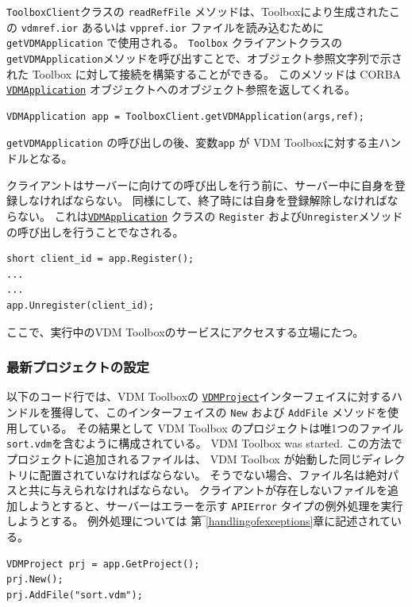 \documentclass[\pformat,12pt]{jarticle}
\newcommand{\VDMApplication}{\hyperlink{interface.VDMApplication}{VDMApplication}}
\newcommand{\VDMProject}{\hyperlink{interface.VDMProject}{VDMProject}}
\begin{document}
{\tt ToolboxClient}クラスの {\tt readRefFile} メソッドは、Toolboxにより生成されたこの \texttt{vdmref.ior} あるいは \texttt{vppref.ior} ファイルを読み込むために{\tt getVDMApplication} で使用される。
 {\tt Toolbox} クライアントクラスの{\tt getVDMApplication}メソッドを呼び出すことで、オブジェクト参照文字列で示された Toolbox に対して接続を構築することができる。
このメソッドは CORBA {\tt \VDMApplication} オブジェクトへのオブジェクト参照を返してくれる。

\begin{verbatim}
VDMApplication app = ToolboxClient.getVDMApplication(args,ref);
\end{verbatim}

{\tt getVDMApplication} の呼び出しの後、変数{\tt app} が VDM Toolboxに対する主ハンドルとなる。

クライアントはサーバーに向けての呼び出しを行う前に、サーバー中に自身を登録しなければならない。
同様にして、終了時には自身を登録解除しなければならない。
これは{\tt \VDMApplication} クラスの  {\tt Register} および{\tt Unregister}メソッドの呼び出しを行うことでなされる。

\begin{verbatim}
short client_id = app.Register();
...
...
app.Unregister(client_id);
\end{verbatim}

ここで、実行中のVDM Toolboxのサービスにアクセスする立場にたつ。

\subsubsection{最新プロジェクトの設定}

以下のコード行では、VDM Toolboxの {\tt \VDMProject}インターフェイスに対するハンドルを獲得して、このインターフェイスの {\tt New} および {\tt AddFile} メソッドを使用している。
その結果として VDM Toolbox のプロジェクトは唯1つのファイル {\tt sort.vdm}を含むように構成されている。
VDM Toolbox was started. 
この方法でプロジェクトに追加されるファイルは、 VDM Toolbox が始動した同じディレクトリに配置されていなければならない。
そうでない場合、ファイル名は絶対パスと共に与えられなければならない。
クライアントが存在しないファイルを追加しようとすると、サーバーはエラーを示す {\tt APIError} タイプの例外処理を実行しようとする。
例外処理については 第‾\ref{handlingofexceptions}章に記述されている。

\begin{verbatim}
VDMProject prj = app.GetProject();
prj.New();
prj.AddFile("sort.vdm");
\end{verbatim}
\end{document}
